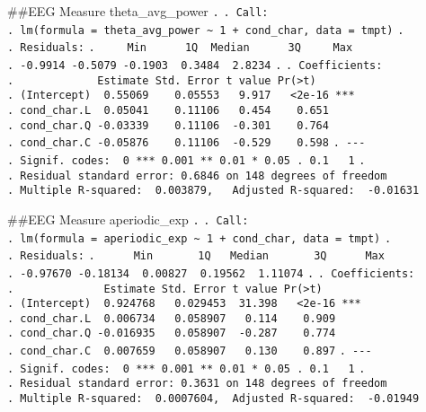 \documentclass[
]{article}
\begin{document}
\#\#EEG Measure theta\_avg\_power \texttt{.} \texttt{.\ Call:}
\texttt{.\ lm(formula\ =\ theta\_avg\_power\ \textasciitilde{}\ 1\ +\ cond\_char,\ data\ =\ tmpt)}
\texttt{.} \texttt{.\ Residuals:}
\texttt{.\ \ \ \ \ Min\ \ \ \ \ \ 1Q\ \ Median\ \ \ \ \ \ 3Q\ \ \ \ \ Max}
\texttt{.\ -0.9914\ -0.5079\ -0.1903\ \ 0.3484\ \ 2.8234} \texttt{.}
\texttt{.\ Coefficients:}
\texttt{.\ \ \ \ \ \ \ \ \ \ \ \ \ Estimate\ Std.\ Error\ t\ value\ Pr(\textgreater{}\textbar{}t\textbar{})}
\texttt{.\ (Intercept)\ \ 0.55069\ \ \ \ 0.05553\ \ \ 9.917\ \ \ \textless{}2e-16\ ***}
\texttt{.\ cond\_char.L\ \ 0.05041\ \ \ \ 0.11106\ \ \ 0.454\ \ \ \ 0.651}
\texttt{.\ cond\_char.Q\ -0.03339\ \ \ \ 0.11106\ \ -0.301\ \ \ \ 0.764}
\texttt{.\ cond\_char.C\ -0.05876\ \ \ \ 0.11106\ \ -0.529\ \ \ \ 0.598}
\texttt{.\ -\/-\/-}
\texttt{.\ Signif.\ codes:\ \ 0\ \textquotesingle{}***\textquotesingle{}\ 0.001\ \textquotesingle{}**\textquotesingle{}\ 0.01\ \textquotesingle{}*\textquotesingle{}\ 0.05\ \textquotesingle{}.\textquotesingle{}\ 0.1\ \textquotesingle{}\ \textquotesingle{}\ 1}
\texttt{.}
\texttt{.\ Residual\ standard\ error:\ 0.6846\ on\ 148\ degrees\ of\ freedom}
\texttt{.\ Multiple\ R-squared:\ \ 0.003879,\ \ \ Adjusted\ R-squared:\ \ -0.01631}

\#\#EEG Measure aperiodic\_exp \texttt{.} \texttt{.\ Call:}
\texttt{.\ lm(formula\ =\ aperiodic\_exp\ \textasciitilde{}\ 1\ +\ cond\_char,\ data\ =\ tmpt)}
\texttt{.} \texttt{.\ Residuals:}
\texttt{.\ \ \ \ \ \ Min\ \ \ \ \ \ \ 1Q\ \ \ Median\ \ \ \ \ \ \ 3Q\ \ \ \ \ \ Max}
\texttt{.\ -0.97670\ -0.18134\ \ 0.00827\ \ 0.19562\ \ 1.11074}
\texttt{.} \texttt{.\ Coefficients:}
\texttt{.\ \ \ \ \ \ \ \ \ \ \ \ \ \ Estimate\ Std.\ Error\ t\ value\ Pr(\textgreater{}\textbar{}t\textbar{})}
\texttt{.\ (Intercept)\ \ 0.924768\ \ \ 0.029453\ \ 31.398\ \ \ \textless{}2e-16\ ***}
\texttt{.\ cond\_char.L\ \ 0.006734\ \ \ 0.058907\ \ \ 0.114\ \ \ \ 0.909}
\texttt{.\ cond\_char.Q\ -0.016935\ \ \ 0.058907\ \ -0.287\ \ \ \ 0.774}
\texttt{.\ cond\_char.C\ \ 0.007659\ \ \ 0.058907\ \ \ 0.130\ \ \ \ 0.897}
\texttt{.\ -\/-\/-}
\texttt{.\ Signif.\ codes:\ \ 0\ \textquotesingle{}***\textquotesingle{}\ 0.001\ \textquotesingle{}**\textquotesingle{}\ 0.01\ \textquotesingle{}*\textquotesingle{}\ 0.05\ \textquotesingle{}.\textquotesingle{}\ 0.1\ \textquotesingle{}\ \textquotesingle{}\ 1}
\texttt{.}
\texttt{.\ Residual\ standard\ error:\ 0.3631\ on\ 148\ degrees\ of\ freedom}
\texttt{.\ Multiple\ R-squared:\ \ 0.0007604,\ \ Adjusted\ R-squared:\ \ -0.01949}
\end{document}
